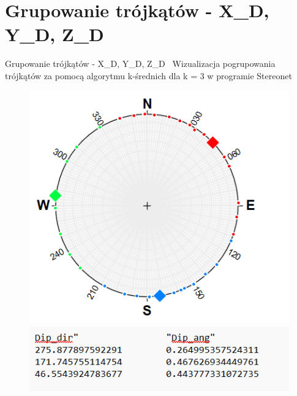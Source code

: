 \documentclass{beamer}
\begin{document}
\section{Grupowanie trójkątów - X\_D, Y\_D, Z\_D}
\begin{frame}{Grupowanie trójkątów - X\_D, Y\_D, Z\_D}
	\centering
	\ Wizualizacja pogrupowania trójkątów za pomocą algorytmu k-średnich dla k = 3 w programie Stereonet
	
	\begin{figure}
		\includegraphics[scale=0.5]{X_D_stereonet.png}
		\includegraphics[scale=0.5]{X_Nsr.png}
	\end{figure}
\end{frame}
\end{document}
